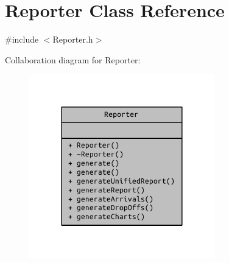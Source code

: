 \hypertarget{class_reporter}{}\section{Reporter Class Reference}
\label{class_reporter}


{\ttfamily \#include $<$Reporter.\+h$>$}



Collaboration diagram for Reporter\+:
\nopagebreak
\begin{figure}[H]
\begin{center}
\leavevmode
\includegraphics[width=228pt]{class_reporter__coll__graph}
\end{center}
\end{figure}
